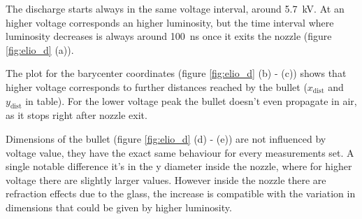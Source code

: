 The discharge starts always in the same voltage interval, around \SI{5.7}{\kilo\volt}. At an higher voltage corresponds an higher luminosity, but the time interval where luminosity decreases is always around \SI{100}{\nano\second} once it exits the nozzle (figure \ref{fig:elio_d} (a)).

The plot for the barycenter coordinates (figure \ref{fig:elio_d} (b) - (c)) shows that higher voltage corresponds to further distances reached by the bullet ($x_{\text{dist}}$ and $y_{\text{dist}}$ in table). For the lower voltage peak the bullet doesn't even propagate in air, as it stops right after nozzle exit.

Dimensions of the bullet (figure \ref{fig:elio_d} (d) - (e)) are not influenced by voltage value, they have the exact same behaviour for every measurements set. A single notable difference it's in the y diameter inside the nozzle, where for higher voltage there are slightly larger values. However inside the nozzle there are refraction effects due to the glass, the increase is compatible with the variation in dimensions that could be given by higher luminosity.

